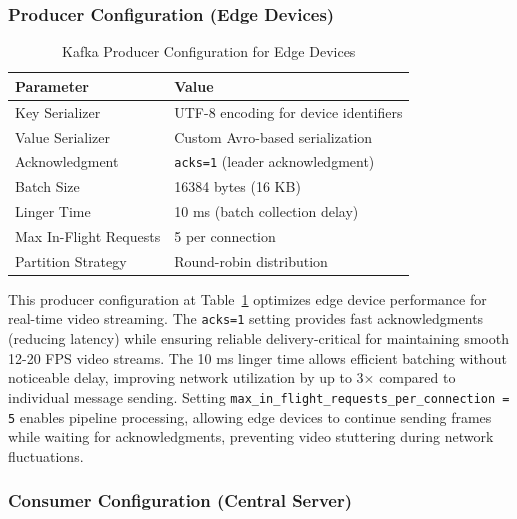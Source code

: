 \newpage

\subsubsection{Producer Configuration (Edge Devices)}

\begin{table}[htbp]
\centering
\caption{Kafka Producer Configuration for Edge Devices}
\label{tab:producer_config}
\begin{tabular}{|p{3cm}|p{8cm}|}
\hline
\textbf{Parameter} & \textbf{Value} \\
\hline

Key Serializer & UTF-8 encoding for device identifiers \\
Value Serializer & Custom Avro-based serialization \\
Acknowledgment & \texttt{acks=1} (leader acknowledgment) \\
Batch Size & 16384 bytes (16 KB) \\
Linger Time & 10 ms (batch collection delay) \\
Max In-Flight Requests & 5 per connection \\
Partition Strategy & Round-robin distribution \\
\hline
\end{tabular}
\end{table}

This producer configuration at Table~\ref{tab:producer_config} optimizes edge device performance for real-time video streaming. The \texttt{acks=1} setting provides fast acknowledgments (reducing latency) while ensuring reliable delivery-critical for maintaining smooth 12-20 FPS video streams. The 10 ms linger time allows efficient batching without noticeable delay, improving network utilization by up to 3$\times$ compared to individual message sending. Setting \texttt{max\_in\_flight\_requests\_per\_connection = 5} enables pipeline processing, allowing edge devices to continue sending frames while waiting for acknowledgments, preventing video stuttering during network fluctuations.

\subsubsection{Consumer Configuration (Central Server)}

